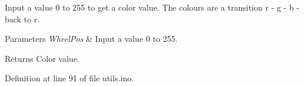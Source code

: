 Input a value 0 to 255 to get a color value. The colours are a transition r -\/ g -\/ b -\/ back to r. 


\begin{DoxyParams}{Parameters}
{\em Wheel\+Pos} & Input a value 0 to 255. \\
\hline
\end{DoxyParams}
\begin{DoxyReturn}{Returns}
Color value. 
\end{DoxyReturn}


Definition at line 91 of file utils.\+ino.

